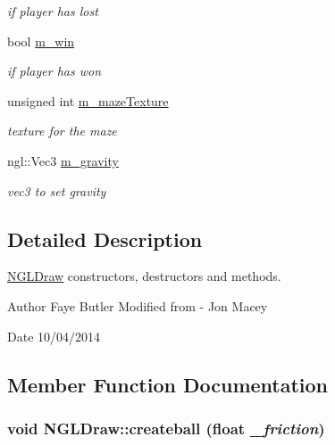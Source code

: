\begin{DoxyCompactItemize}
\begin{DoxyCompactList}\small\item\em if player has lost \item\end{DoxyCompactList}\item 
\hypertarget{classNGLDraw_ae823c04d494102ab367e4ed04f545b48}{
bool \hyperlink{classNGLDraw_ae823c04d494102ab367e4ed04f545b48}{m\_\-win}}
\label{classNGLDraw_ae823c04d494102ab367e4ed04f545b48}

\begin{DoxyCompactList}\small\item\em if player has won \item\end{DoxyCompactList}\item 
\hypertarget{classNGLDraw_a7acce7bc4f5cf7560e261d4e58af7de5}{
unsigned int \hyperlink{classNGLDraw_a7acce7bc4f5cf7560e261d4e58af7de5}{m\_\-mazeTexture}}
\label{classNGLDraw_a7acce7bc4f5cf7560e261d4e58af7de5}

\begin{DoxyCompactList}\small\item\em texture for the maze \item\end{DoxyCompactList}\item 
\hypertarget{classNGLDraw_a7aa4c080fb4b41d0996304227d6b63d2}{
ngl::Vec3 \hyperlink{classNGLDraw_a7aa4c080fb4b41d0996304227d6b63d2}{m\_\-gravity}}
\label{classNGLDraw_a7aa4c080fb4b41d0996304227d6b63d2}

\begin{DoxyCompactList}\small\item\em vec3 to set gravity \item\end{DoxyCompactList}\end{DoxyCompactItemize}


\subsection{Detailed Description}
\hyperlink{classNGLDraw}{NGLDraw} constructors, destructors and methods. \begin{DoxyAuthor}{Author}
Faye Butler Modified from -\/ Jon Macey 
\end{DoxyAuthor}
\begin{DoxyDate}{Date}
10/04/2014 
\end{DoxyDate}


\subsection{Member Function Documentation}
\hypertarget{classNGLDraw_a11a65720f14b3b58173c23daf8013e7c}{
\subsubsection[{createball}]{\setlength{\rightskip}{0pt plus 5cm}void NGLDraw::createball (float {\em \_\-friction})}}
\label{classNGLDraw_a11a65720f14b3b58173c23daf8013e7c}


